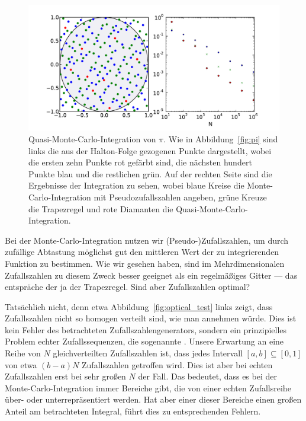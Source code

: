\subsection{}

\begin{figure}
  \centering
  \includegraphics[width=\textwidth]{plots/quasirandom}
  \caption{Quasi-Monte-Carlo-Integration von $\pi$. Wie in
    Abbildung~\ref{fig:pi} sind links die aus der Halton-Folge
    gezogenen Punkte dargestellt, wobei die ersten zehn Punkte rot
    gefärbt sind, die nächsten hundert Punkte blau und die restlichen
    grün. Auf der rechten Seite sind die Ergebnisse der Integration zu
    sehen, wobei blaue Kreise die Monte-Carlo-Integration mit
    Pseudozufallszahlen angeben, grüne Kreuze die Trapezregel und rote
    Diamanten die Quasi-Monte-Carlo-Integration.}
  \label{fig:qmc}
\end{figure}

Bei der Monte-Carlo-Integration nutzen wir (Pseudo-)Zufallszahlen, um
durch zufällige Abtastung möglichst gut den mittleren Wert der zu
integrierenden Funktion zu bestimmen. Wie wir gesehen haben, sind im
Mehrdimensionalen Zufallszahlen zu diesem Zweck besser geeignet als
ein regelmäßiges Gitter --- das entspräche der ja der
Trapezregel. Sind aber Zufallszahlen optimal?

Tatsächlich nicht, denn etwa Abbildung~\ref{fig:optical_test} links
zeigt, dass Zufallszahlen nicht so homogen verteilt sind, wie man
annehmen würde. Dies ist kein Fehler des betrachteten
Zufallszahlengenerators, sondern ein prinzipielles Problem echter
Zufallssequenzen, die sogenannte \emph{}. Unsere
Erwartung an eine Reihe von $N$ gleichverteilten Zufallszahlen ist,
dass jedes Intervall $[a,b]\subseteq [0,1]$ von etwa $(b-a)N$
Zufallszahlen getroffen wird. Dies ist aber bei echten Zufallszahlen
erst bei sehr großen $N$ der Fall. Das bedeutet, dass es bei der
Monte-Carlo-Integration immer Bereiche gibt, die von einer echten
Zufallsreihe über- oder unterrepräsentiert werden. Hat aber einer
dieser Bereiche einen großen Anteil am betrachteten Integral, führt
dies zu entsprechenden Fehlern.

